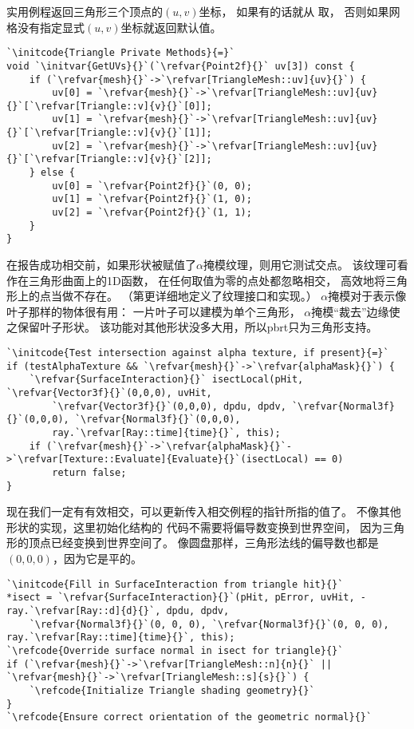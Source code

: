 实用例程返回三角形三个顶点的$(u,v)$坐标，
如果有的话就从
取，
否则如果网格没有指定显式$(u,v)$坐标就返回默认值。
\begin{lstlisting}
`\initcode{Triangle Private Methods}{=}`
void `\initvar{GetUVs}{}`(`\refvar{Point2f}{}` uv[3]) const {
    if (`\refvar{mesh}{}`->`\refvar[TriangleMesh::uv]{uv}{}`) {
        uv[0] = `\refvar{mesh}{}`->`\refvar[TriangleMesh::uv]{uv}{}`[`\refvar[Triangle::v]{v}{}`[0]];
        uv[1] = `\refvar{mesh}{}`->`\refvar[TriangleMesh::uv]{uv}{}`[`\refvar[Triangle::v]{v}{}`[1]];
        uv[2] = `\refvar{mesh}{}`->`\refvar[TriangleMesh::uv]{uv}{}`[`\refvar[Triangle::v]{v}{}`[2]];
    } else {
        uv[0] = `\refvar{Point2f}{}`(0, 0);
        uv[1] = `\refvar{Point2f}{}`(1, 0);
        uv[2] = `\refvar{Point2f}{}`(1, 1);
    }
}
\end{lstlisting}

在报告成功相交前，如果形状被赋值了$\alpha$掩模纹理，则用它测试交点。
该纹理可看作在三角形曲面上的1D函数，
在任何取值为零的点处都忽略相交，
高效地将三角形上的点当做不存在。
（第更详细地定义了纹理接口和实现。）
$\alpha$掩模对于表示像叶子那样的物体很有用：
一片叶子可以建模为单个三角形，
$\alpha$掩模“裁去”边缘使之保留叶子形状。
该功能对其他形状没多大用，所以pbrt只为三角形支持。
\begin{lstlisting}
`\initcode{Test intersection against alpha texture, if present}{=}`
if (testAlphaTexture && `\refvar{mesh}{}`->`\refvar{alphaMask}{}`) {
    `\refvar{SurfaceInteraction}{}` isectLocal(pHit, `\refvar{Vector3f}{}`(0,0,0), uvHit,
        `\refvar{Vector3f}{}`(0,0,0), dpdu, dpdv, `\refvar{Normal3f}{}`(0,0,0), `\refvar{Normal3f}{}`(0,0,0),
        ray.`\refvar[Ray::time]{time}{}`, this);
    if (`\refvar{mesh}{}`->`\refvar{alphaMask}{}`->`\refvar[Texture::Evaluate]{Evaluate}{}`(isectLocal) == 0)
        return false;
}
\end{lstlisting}
现在我们一定有有效相交，可以更新传入相交例程的指针所指的值了。
不像其他形状的实现，这里初始化结构的
代码不需要将偏导数变换到世界空间，
因为三角形的顶点已经变换到世界空间了。
像圆盘那样，三角形法线的偏导数也都是$(0,0,0)$，因为它是平的。
\begin{lstlisting}
`\initcode{Fill in SurfaceInteraction from triangle hit}{}`
*isect = `\refvar{SurfaceInteraction}{}`(pHit, pError, uvHit, -ray.`\refvar[Ray::d]{d}{}`, dpdu, dpdv,
    `\refvar{Normal3f}{}`(0, 0, 0), `\refvar{Normal3f}{}`(0, 0, 0), ray.`\refvar[Ray::time]{time}{}`, this);
`\refcode{Override surface normal in isect for triangle}{}`
if (`\refvar{mesh}{}`->`\refvar[TriangleMesh::n]{n}{}` || `\refvar{mesh}{}`->`\refvar[TriangleMesh::s]{s}{}`) {
    `\refcode{Initialize Triangle shading geometry}{}`
}
`\refcode{Ensure correct orientation of the geometric normal}{}`
\end{lstlisting}

